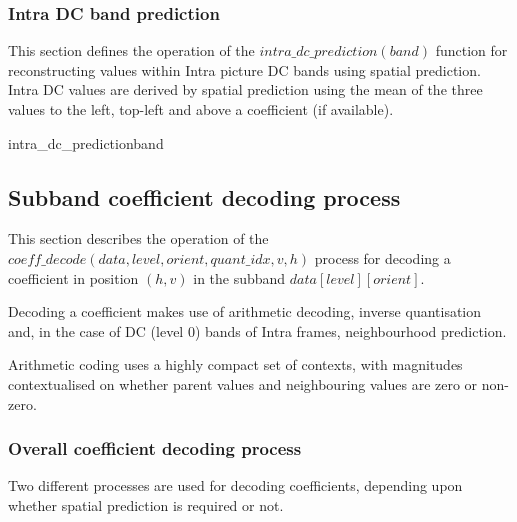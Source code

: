 \subsubsection{Intra DC band prediction}
\label{intradcprediction}

This section defines the operation of the $intra\_dc\_prediction(band)$ function
for reconstructing values within Intra picture DC bands using spatial prediction.
Intra DC values are derived by spatial prediction using the mean of the
three values to the left, top-left and above a coefficient (if available).

\begin{pseudo}{intra\_dc\_prediction}{band}
        \bsELSE
        \bsEND
    \bsELSE
        \bsELSE
        \bsEND
    \bsEND
  \bsEND
\bsEND
\end{pseudo}
\subsection{Subband coefficient decoding process}

\label{wltcoeff}

This section describes the operation of the 
$coeff\_decode(data,level,orient,quant\_idx,v,h)$ process
for decoding a coefficient in position $(h,v)$ in the subband $data[level][orient]$.

Decoding a coefficient makes use of arithmetic decoding, inverse quantisation
and, in the case of DC (level 0) bands of Intra frames, neighbourhood prediction.

Arithmetic coding uses a highly compact set of contexts, 
with magnitudes contextualised on whether parent values
and neighbouring values are zero or non-zero.

\subsubsection{Overall coefficient decoding process}

Two different processes are used for decoding coefficients, depending
upon whether spatial prediction is required or not.

